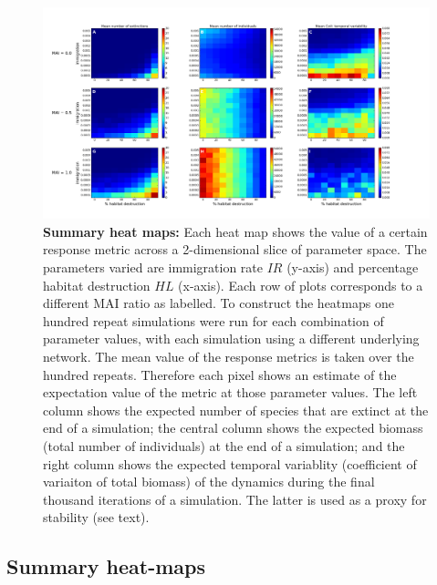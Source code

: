 \begin{itemize}
\begin{figure}
        \includegraphics[width=\linewidth]{"./chapters/chapter04/figures/sum_maps"}
        \caption{\textbf{Summary heat maps:} Each heat map shows the value of a certain response metric across a 2-dimensional slice of parameter space. The parameters varied are immigration rate $IR$ (y-axis) and percentage habitat destruction $HL$ (x-axis). Each row of plots corresponds to a different MAI ratio as labelled. To construct the heatmaps one hundred repeat simulations were run for each combination of parameter values, with each simulation using a different underlying network. The mean value of the response metrics is taken over the hundred repeats. Therefore each pixel shows an estimate of the expectation value of the metric at those parameter values. The left column shows the expected number of species that are extinct at the end of a simulation; the central column shows the expected biomass (total number of individuals) at the end of a simulation; and the right column shows the expected temporal variablity (coefficient of variaiton of total biomass) of the dynamics during the final thousand iterations of a simulation. The latter is used as a proxy for stability (see text).}\label{fig:summary_heatmaps_imvshl}
\end{figure}
\clearpage

\subsection{Summary heat-maps}
\label{sec:sum_heat_maps}


\end{itemize}
